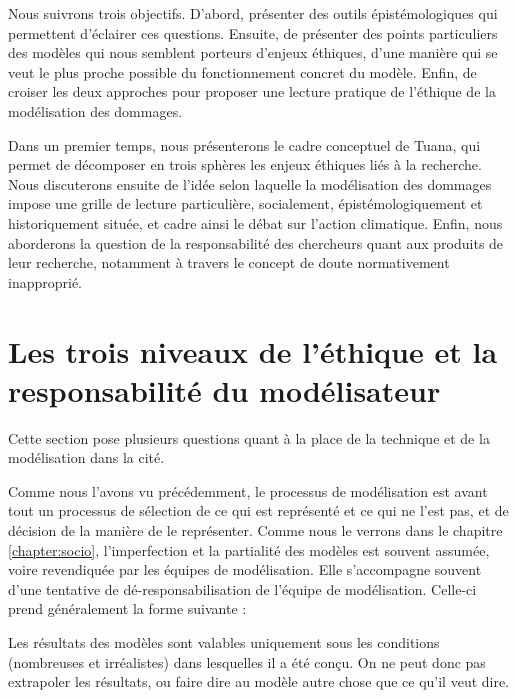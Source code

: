 Nous suivrons trois objectifs. D'abord, présenter des outils épistémologiques qui permettent d'éclairer ces questions. Ensuite, de présenter des points particuliers des modèles qui nous semblent porteurs d'enjeux éthiques, d'une manière qui se veut le plus proche possible du fonctionnement concret du modèle. Enfin, de croiser les deux approches pour proposer une lecture pratique de l'éthique de la modélisation des dommages. 

Dans un premier temps, nous présenterons le cadre conceptuel de Tuana, qui permet de décomposer en trois sphères les enjeux éthiques liés à la recherche. Nous discuterons ensuite de l'idée selon laquelle la modélisation des dommages impose une grille de lecture particulière, socialement, épistémologiquement et historiquement située, et cadre ainsi le débat sur l'action climatique. Enfin, nous aborderons la question de la responsabilité des chercheurs quant aux produits de leur recherche, notamment à travers le concept de doute normativement inapproprié. 








\section{Les trois niveaux de l'éthique et la responsabilité du modélisateur}

Cette section pose plusieurs questions quant à la place de la technique et de la modélisation dans la cité. 



Comme nous l'avons vu précédemment, le processus de modélisation est avant tout un processus de sélection de ce qui est représenté et ce qui ne l'est pas, et de décision de la manière de le représenter. Comme nous le verrons dans le chapitre \ref{chapter:socio}, l'imperfection et la partialité des modèles est souvent assumée, voire revendiquée par les équipes de modélisation. Elle s'accompagne souvent d'une tentative de dé-responsabilisation de l'équipe de modélisation. Celle-ci prend généralement la forme suivante : 

\begin{authoredquote}
    Les résultats des modèles sont valables uniquement sous les conditions (nombreuses et irréalistes) dans lesquelles il a été conçu. On ne peut donc pas extrapoler les résultats, ou faire dire au modèle autre chose que ce qu'il veut dire. 
\end{authoredquote}

